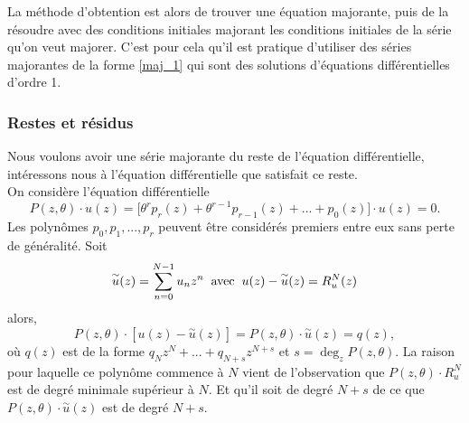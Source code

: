 \documentclass[a4paper,10pt]{article}
\begin{document}
	La méthode d'obtention est alors de  trouver une équation majorante, puis de la résoudre avec des conditions initiales majorant les conditions initiales de la série qu'on veut majorer. C'est pour cela qu'il est pratique d'utiliser des séries majorantes de la forme \eqref{maj_1} qui sont des solutions d'équations différentielles d'ordre 1.
	
	\subsubsection{Restes et résidus}
	Nous voulons avoir une série majorante du reste de l'équation différentielle, intéressons nous à l'équation différentielle que satisfait ce reste.\\
	On considère l'équation différentielle
	\begin{equation}
	P(z,\theta) \cdot u(z)=\big[\theta^{r}p_r(z)+\theta^{r-1}p_{r-1}(z)+...+p_0(z)\big]\cdot u(z)=0.
	\label{Eqdiff}
	\end{equation}
	Les polynômes $p_0,p_1,...,p_r$ peuvent être considérés premiers entre eux sans perte de généralité. Soit
	\[\overset{\sim}{u}(z)=\sum_{n=0}^{N-1}u_n z^n\hspace{2mm}\text{avec}\hspace{2mm}u(z)-\overset{\sim}{u}(z)=R_u^{N}(z)\] 
	alors, 
	\[  P(z,\theta) \cdot [u(z)-\overset{\sim}{u}(z)]=P(z,\theta)\cdot \overset{\sim}{u}(z)=q(z),\]
	où $q(z)$ est de la forme $q_Nz^N+...+q_{N+s}z^{N+s}$ et $s= \deg_{z}P(z,\theta)$. La raison pour laquelle ce polynôme commence à $N$ vient de l'observation que 
	$P(z,\theta)\cdot R_u^{N}$ est de degré minimale supérieur à $N$. Et qu'il soit de degré $N+s$ de ce que $P(z,\theta)\cdot\overset{\sim}{u}(z)$ est de degré $N+s$.
\end{document}
